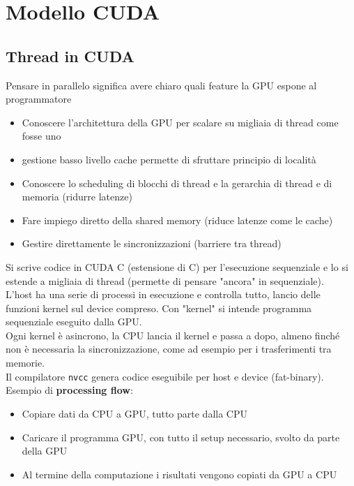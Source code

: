
\section{Modello CUDA}

\subsection{Thread in CUDA}
Pensare in parallelo significa avere chiaro quali feature la GPU espone al programmatore
\begin{itemize}
	\item Conoscere l'architettura della GPU per scalare su migliaia di thread come fosse uno
	\item gestione basso livello cache permette di sfruttare principio di località
	\item Conoscere lo scheduling di blocchi di thread e la gerarchia di thread e di memoria (ridurre latenze)
	\item Fare impiego diretto della shared memory (riduce latenze come le cache)
	\item Gestire direttamente le sincronizzazioni (barriere tra thread)
\end{itemize}

Si scrive codice in CUDA C (estensione di C) per l'esecuzione sequenziale e lo si estende a migliaia di thread (permette di pensare "ancora" in sequenziale).\\

L'host ha una serie di processi in esecuzione e controlla tutto, lancio delle funzioni kernel sul device compreso. Con "kernel" si intende programma sequenziale eseguito dalla GPU.\\
Ogni kernel è asincrono, la CPU lancia il kernel e passa a dopo, almeno finché non è necessaria la sincronizzazione, come ad esempio per i trasferimenti tra memorie.\\

Il compilatore \texttt{nvcc} genera codice eseguibile per host e device (fat-binary).\\

Esempio di \textbf{processing flow}: 
\begin{itemize}
	\item Copiare dati da CPU a GPU, tutto parte dalla CPU
	\item Caricare il programma GPU, con tutto il setup necessario, svolto da parte della GPU
	\item Al termine della computazione i risultati vengono copiati da GPU a CPU
\end{itemize}

